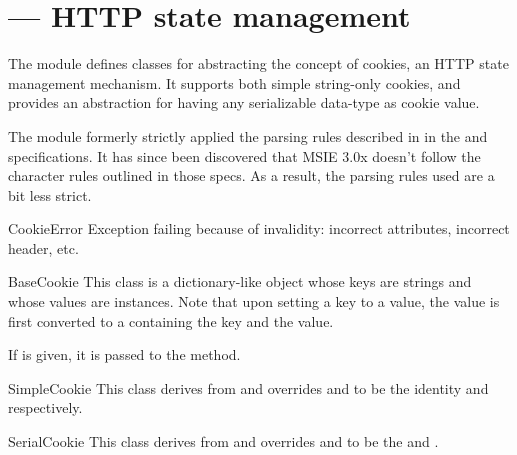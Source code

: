 \section{ ---
         HTTP state management}



The  module defines classes for abstracting the concept of 
cookies, an HTTP state management mechanism. It supports both simple
string-only cookies, and provides an abstraction for having any serializable
data-type as cookie value.

The module formerly strictly applied the parsing rules described in in
the  and  specifications.  It has since been discovered
that MSIE 3.0x doesn't follow the character rules outlined in those
specs.  As a result, the parsing rules used are a bit less strict.

\begin{excdesc}{CookieError}
Exception failing because of  invalidity: incorrect
attributes, incorrect  header, etc.
\end{excdesc}

\begin{classdesc}{BaseCookie}{}
This class is a dictionary-like object whose keys are strings and
whose values are  instances. Note that upon setting a key to
a value, the value is first converted to a  containing
the key and the value.

If  is given, it is passed to the  method.
\end{classdesc}

\begin{classdesc}{SimpleCookie}{}
This class derives from  and overrides
 and  to be the identity
and  respectively.
\end{classdesc}

\begin{classdesc}{SerialCookie}{}
This class derives from  and overrides
 and  to be the
 and .

\end{classdesc}

